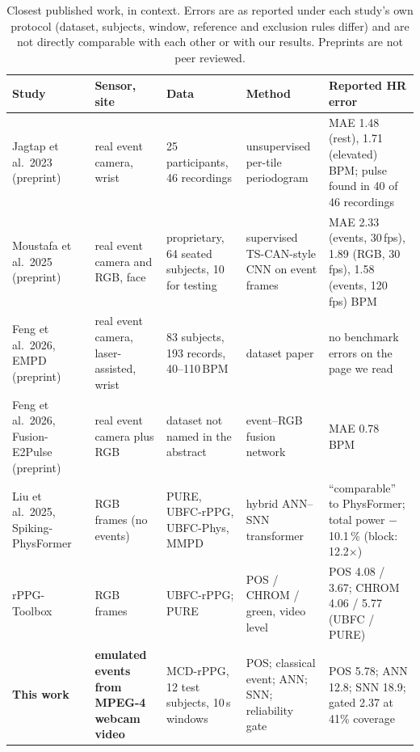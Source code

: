 \documentclass[10pt,journal]{IEEEtran}
\begin{document}
\begin{table}[t]\centering\caption{Closest published work, in context. Errors are as reported under each study's own protocol (dataset, subjects, window, reference and exclusion rules differ) and are not directly comparable with each other or with our results. Preprints are not peer reviewed.}\label{tab:lit}\scriptsize
\begin{tabular}{p{2.4cm}p{3.1cm}p{3.7cm}p{3.6cm}p{3.1cm}}\toprule
Study & Sensor, site & Data & Method & Reported HR error\\\midrule
Jagtap et al.\ 2023~\cite{jagtap2023hr} (preprint) & real event camera, wrist & 25 participants, 46 recordings & unsupervised per-tile periodogram & MAE 1.48 (rest), 1.71 (elevated) BPM; pulse found in 40 of 46 recordings\\
Moustafa et al.\ 2025~\cite{moustafa2025event} (preprint) & real event camera and RGB, face & proprietary, 64 seated subjects, 10 for testing & supervised TS-CAN-style CNN on event frames & MAE 2.33 (events, 30\,fps), 1.89 (RGB, 30\,fps), 1.58 (events, 120\,fps) BPM\\
Feng et al.\ 2026, EMPD~\cite{feng2026empd} (preprint) & real event camera, laser-assisted, wrist & 83 subjects, 193 records, 40--110\,BPM & dataset paper & no benchmark errors on the page we read\\
Feng et al.\ 2026, Fusion-E2Pulse~\cite{feng2026fusion} (preprint) & real event camera plus RGB & dataset not named in the abstract & event--RGB fusion network & MAE 0.78 BPM\\
Liu et al.\ 2025, Spiking-PhysFormer~\cite{liu2025spikingphysformer} & RGB frames (no events) & PURE, UBFC-rPPG, UBFC-Phys, MMPD & hybrid ANN--SNN transformer & ``comparable'' to PhysFormer; total power $-$10.1\,\% (block: 12.2$\times$)\\
rPPG-Toolbox~\cite{liu2023rppgtoolbox} & RGB frames & UBFC-rPPG; PURE & POS / CHROM / green, video level & POS 4.08 / 3.67; CHROM 4.06 / 5.77 (UBFC / PURE)\\
\textbf{This work} & \textbf{emulated events from MPEG-4 webcam video} & MCD-rPPG, 12 test subjects, 10\,s windows & POS; classical event; ANN; SNN; reliability gate & POS 5.78; ANN 12.8; SNN 18.9; gated 2.37 at 41\% coverage\\\bottomrule
\end{tabular}
\end{table}
\end{document}
